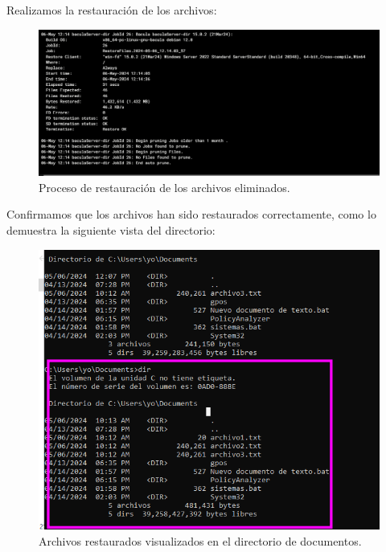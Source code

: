 Realizamos la restauración de los archivos:

\begin{figure}[H]
    \centering
    \includegraphics[width=0.5\linewidth]{instalacionBacula/restoreWIndows.png}
    \caption{Proceso de restauración de los archivos eliminados.}
\end{figure}

Confirmamos que los archivos han sido restaurados correctamente, como lo demuestra la siguiente vista del directorio:

\begin{figure}[H]
    \centering
    \includegraphics[width=0.5\linewidth]{instalacionBacula/restauracionWinCompleta.png}
    \caption{Archivos restaurados visualizados en el directorio de documentos.}
\end{figure}
